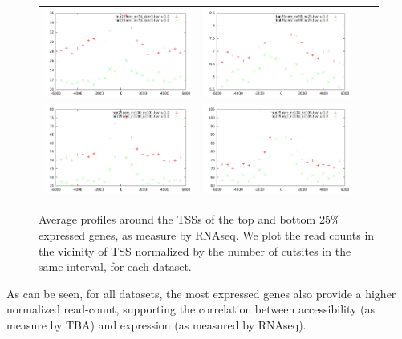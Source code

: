 \documentclass[11pt,a4paper]{article}
\begin{document}
\begin{figure}[htb]
\centering
  \begin{tabular}{@{}cccc@{}}
    \includegraphics[width=.5\textwidth]{nc74_skbr3.pdf} &
    \includegraphics[width=.5\textwidth]{nc59_nc25.pdf} \\
    \includegraphics[width=.5\textwidth]{nc100_nc101.pdf} &
    \includegraphics[width=.5\textwidth]{nc104_nc105.pdf}   \\
  \end{tabular}
  \caption{Average profiles around the TSSs of the top and bottom 25\% expressed genes, as measure by RNAseq. We plot the read counts in the vicinity of TSS normalized by the number of cutsites in the same interval, for each dataset.}
  \label{fig:rnaVSdna}
\end{figure}

As can be seen, for all datasets, the most expressed genes also provide a higher normalized read-count, supporting the correlation between accessibility (as measure by TBA) and expression (as measured by RNAseq).
\end{document}
